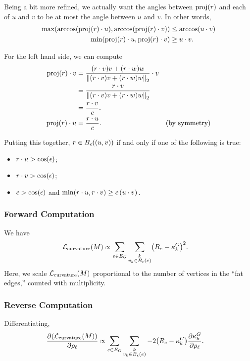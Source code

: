Being a bit more refined, we actually want the angles between \(\proj\pof{r}\) and each of \(u\) and \(v\) to be at most the angle between \(u\) and \(v\). In other words, \begin{align*}
	\max\pof{\arccos\pof{\proj\pof{r} \cdot u}, \arccos\pof{\proj\pof{r} \cdot v}} &\le \arccos\pof{u \cdot v} \\
	\min\pof{\proj\pof{r} \cdot u, \proj\pof{r} \cdot v} &\ge u \cdot v.
\end{align*}

For the left hand side, we can compute
\begin{align*}
	\proj\pof{r} \cdot v &= \frac{\pof{r \cdot v}v + \pof{r \cdot w}w}{\norm{\pof{r \cdot v}v + \pof{r \cdot w}w}_2} \cdot v \\
		&= \frac{r \cdot v}{\norm{\pof{r \cdot v}v + \pof{r \cdot w}w}_2} \\
		&= \frac{r \cdot v}{c}. \\
	\proj\pof{r} \cdot u &= \frac{r \cdot u}{c}. & \text{(by symmetry)}
\end{align*}

Putting this together, \(r \in B_\epsilon\pof{\pof{u, v}}\) if and only if one of the following is true:
\begin{itemize}
	\item
	\(r \cdot u > \cos\pof{\epsilon}\);
	\item
	\(r \cdot v > \cos\pof{\epsilon}\);
	\item
	\(c > \cos\pof{\epsilon}\) and \(\min\pof{r \cdot u, r \cdot v} \ge c\,\pof{u \cdot v}\).
\end{itemize}

\subsubsection{Forward Computation}
We have \begin{align*}
	\mathcal{L}_{\mathrm{curvature}}\pof{M} &\propto \sum_{e \in E_G} \sum_{\substack{k \\ v_k \in B_\epsilon\pof{e}}} \pof{R_e - \kappa^G_k}^2.
\end{align*} Here, we scale \(\mathcal{L}_{\mathrm{curvature}}\pof{M}\) proportional to the number of vertices in the ``fat edges,'' counted with multiplicity.

\subsubsection{Reverse Computation}
Differentiating, \begin{align*}
	\frac{\partial\pof{\mathcal{L}_{\mathrm{curvature}}\pof{M}}}{\partial\rho_\ell} &\propto \sum_{e \in E_G} \sum_{\substack{k \\ v_k \in B_\epsilon\pof{e}}} -2\pof{R_e - \kappa^G_k}\frac{\partial\kappa^G_k}{\partial\rho_\ell}.
\end{align*}
